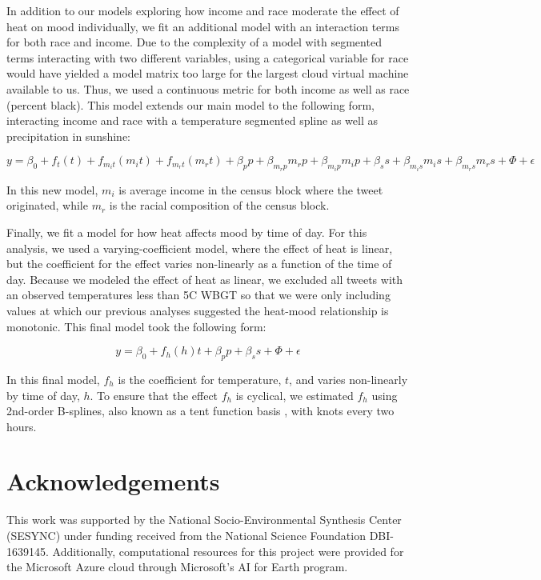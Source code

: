 \documentclass[fleqn,10pt]{wlscirep}
\begin{document}
In addition to our models exploring how income and race moderate the effect of heat on mood individually, we fit an additional model with an interaction terms for both race and income. Due to the complexity of a model with segmented terms interacting with two different variables, using a categorical variable for race would have yielded a model matrix too large for the largest cloud virtual machine available to us. Thus, we used a continuous metric for both income as well as race (percent black). This model extends our main model to the following form, interacting income and race with a temperature segmented spline as well as precipitation in sunshine:

\begin{equation}
 y = \beta_0 + f_t(t) + f_{m_{i}t}(m_{i} t) + f_{m_{r}t}(m_{r} t) +  \beta_p p + \beta_{m_{r} p} m_{r} p + \beta_{m_{i} p} m_{i} p + \beta_s s + \beta_{m_{i} s} m_{i} s +  \beta_{m_{r} s} m_{r} s + 
 \Phi + \epsilon
 \label{mod:race-inc}
\end{equation}

In this new model, $m_{i}$ is average income in the census block where the tweet originated, while $m_{r}$ is the racial composition of the census block.

Finally, we fit a model for how heat affects mood by time of day. For this analysis, we used a varying-coefficient model, where the effect of heat is linear, but the coefficient for the effect varies non-linearly as a function of the time of day. Because we modeled the effect of heat as linear, we excluded all tweets with an observed temperatures less than 5\textdegree C WBGT so that we were only including values at which our previous analyses suggested the heat-mood relationship is monotonic. This final model took the following form:

\begin{equation}
 y = \beta_0 + f_h(h)t + \beta_p p + \beta_s s + \Phi + \epsilon
 \label{mod:tod}
\end{equation}

In this final model, $f_{h}$ is the coefficient for temperature, $t$, and varies non-linearly by time of day, $h$. To ensure that the effect $f_{h}$ is cyclical, we estimated $f_{h}$ using 2nd-order B-splines, also known as a tent function basis \cite[Chapter~4.2]{wood2017generalized}, with knots every two hours.

\section*{Acknowledgements}
This work was supported by the National Socio-Environmental Synthesis Center (SESYNC) under funding received from the National Science Foundation DBI-1639145. Additionally, computational resources for this project were provided for the Microsoft Azure cloud through Microsoft's AI for Earth program.
\end{document}
